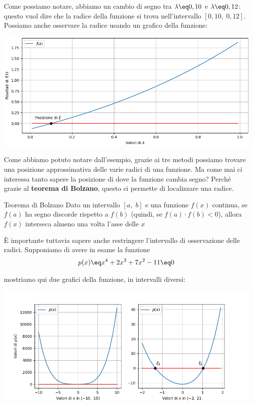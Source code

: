 \begin{example}
    Come possiamo notare, abbiamo un cambio di segno tra $\lambda \eq 0,10$ e $\lambda \eq 0,12$: questo vuol dire che la radice della funzione si trova nell'intervallo $[0,10, \; 0,12]$. Possiamo anche osservare la radice usando un grafico della funzione:
    \begin{center}
        \includegraphics[width=\linewidth]{assets/image-002.png}
    \end{center}
\end{example}

Come abbiamo potuto notare dall'esempio, grazie ai tre metodi possiamo trovare una posizione approssimativa delle varie radici di una funzione. Ma come mai ci interessa tanto sapere la posizione di dove la funzione cambia segno? Perché grazie al \textbf{teorema di Bolzano}, questo ci permette di localizzare una radice.

\begin{theorem}{Teorema di Bolzano}
    Dato un intervallo $[a, \; b]$ e una funzione $f(x)$ continua, se $f(a)$ ha segno discorde rispetto a $f(b)$ (quindi, se $f(a) \cdot f(b) < 0$), allora $f(x)$ interseca almeno una volta l'asse delle $x$
\end{theorem}

È importante tuttavia sapere anche restringere l'intervallo di osservazione delle radici. Supponiamo di avere in esame la funzione
\[ p(x) \eq x^4 + 2x^3 + 7x^2 - 11 \eq 0 \]

mostriamo qui due grafici della funzione, in intervalli diversi:
\begin{center}
    \includegraphics[width=\linewidth]{assets/image-003.png}
\end{center}

